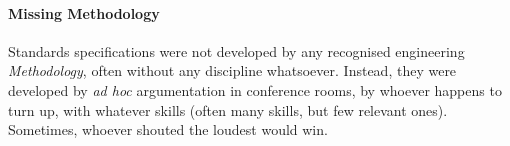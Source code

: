 %
%
%
%
%
%
%

\paragraph{Missing Methodology}
\label{missing_methodology_heading}

Standards specifications were not developed by any recognised engineering
\emph{Methodology}, often without any discipline whatsoever. Instead, they were
developed by \emph{ad hoc} argumentation in conference rooms, by whoever happens
to turn up, with whatever skills (often many skills, but few relevant ones).
Sometimes, whoever shouted the loudest would win.
